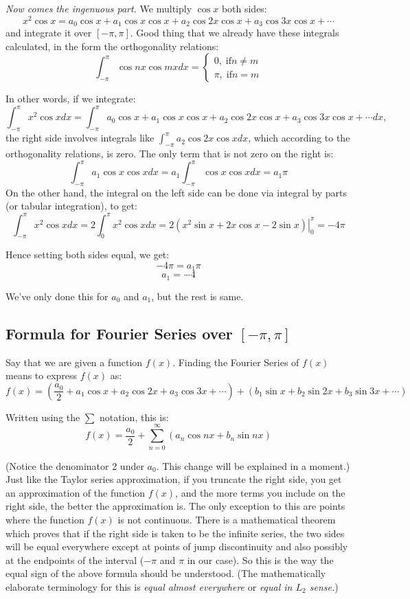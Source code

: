 \documentclass[12pt]{report}
\begin{document}
\textit{Now comes the ingenuous part.} We multiply $\cos x $ both sides:
$$x^2 \cos x = a_0 \cos x + a_1 \cos x \cos x + a_2 \cos 2x \cos x + a_3 \cos 3x \cos x + \cdots $$
and integrate it over $[-\pi, \pi]$. Good thing that we already have these integrals calculated, in the form the orthogonality relations:
$$\int_{-\pi}^{\pi} \cos nx \cos mx dx = \begin{cases} 0, \; \mathrm{ if } n \neq m \\ \pi, \; \mathrm{ if } n = m \end{cases} $$

In other words, if we integrate:
$$\int_{-\pi}^{\pi} x^2 \cos x dx = \int_{-\pi}^{\pi} a_0 \cos x + a_1 \cos x \cos x + a_2 \cos 2x \cos x + a_3 \cos 3x \cos x + \cdots  dx, $$
the right side involves integrals like $\int_{-\pi}^{\pi} a_2 \cos 2x \cos x dx$, which according to the orthogonality relations, is zero. The only term that is not zero on the right is:
$$\int_{-\pi}^{\pi} a_1 \cos x \cos x dx = a_1 \int_{-\pi}^{\pi} \cos x \cos x dx = a_1 \pi $$
On the other hand, the integral on the left side can be done via integral by parts (or tabular integration), to get:
$$\int_{-\pi}^{\pi} x^2 \cos x dx = 2\int_{0}^{\pi} x^2 \cos x dx = 2 \left. \left(x^2 \sin x + 2x \cos x - 2 \sin x \right) \right\vert_{0}^{\pi} = -4\pi$$

Hence setting both sides equal, we get:
$$-4 \pi = a_1 \pi $$
$$a_1 = -4 $$

We've only done this for $a_0$ and $a_1$, but the rest is same.

\subsection*{Formula for Fourier Series over  $[-\pi, \pi]$}

Say that we are given a function $f(x)$. Finding the Fourier Series of $f(x)$ means to express $f(x)$ as:
$$f(x) = (\frac{a_0}{2} + a_1 \cos x + a_2 \cos 2x + a_3 \cos 3x  + \cdots) + (b_1 \sin x + b_2 \sin 2x + b_3 \sin 3x + \cdots)$$

Written using the $\sum$ notation, this is:
$$f(x) = \frac{a_0}{2} +\sum_{n=0}^{\infty} \left( a_n \cos nx + b_n \sin nx \right) $$

(Notice the denominator 2 under $a_0$. This change will be explained in a moment.)
Just like the Taylor series approximation, if you truncate the right side, you get an approximation of the function $f(x)$, and the more terms you include on the right side, the better the approximation is. The only exception to this are points where the function $f(x)$ is not continuous. There is a mathematical theorem which proves that if the right side is taken to be the infinite series, the two sides will be equal everywhere except at points of jump discontinuity and also possibly at the endpoints of the interval ($-\pi$ and $\pi$ in our case). So this is the way the equal sign of the above formula should be understood. (The mathematically elaborate terminology for this is \textit{equal almost everywhere} or \textit{equal in $L_2$ sense.})
\end{document}
